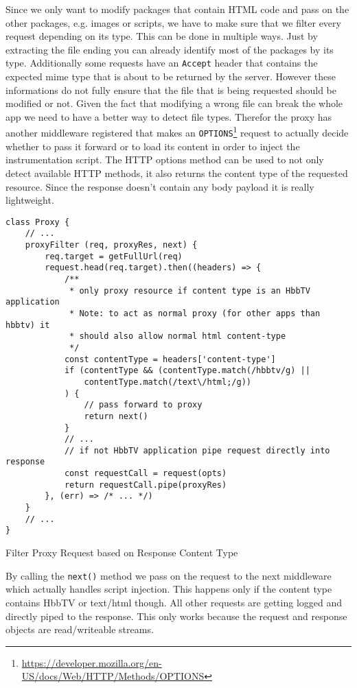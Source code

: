 Since we only want to modify packages that contain HTML code and pass on the other packages, e.g. images or scripts, we have to make sure that we filter every request depending on its type. This can be done in multiple ways. Just by extracting the file ending you can already identify most of the packages by its type. Additionally some requests have an \texttt{Accept} header that contains the expected mime type that is about to be returned by the server. However these informations do not fully ensure that the file that is being requested should be modified or not. Given the fact that modifying a wrong file can break the whole app we need to have a better way to detect file types. Therefor the proxy has another middleware registered that makes an \texttt{OPTIONS}\footnote{\url{https://developer.mozilla.org/en-US/docs/Web/HTTP/Methods/OPTIONS}} request to actually decide whether to pass it forward or to load its content in order to inject the instrumentation script. The HTTP options method can be used to not only detect available HTTP methods, it also returns the content type of the requested resource. Since the response doesn't contain any body payload it is really lightweight.

\begin{listing}[H]
\begin{verbatim}
class Proxy {
    // ...
    proxyFilter (req, proxyRes, next) {
        req.target = getFullUrl(req)
        request.head(req.target).then((headers) => {
            /**
             * only proxy resource if content type is an HbbTV application
             * Note: to act as normal proxy (for other apps than hbbtv) it
             * should also allow normal html content-type
             */
            const contentType = headers['content-type']
            if (contentType && (contentType.match(/hbbtv/g) ||
                contentType.match(/text\/html;/g))
            ) {
                // pass forward to proxy
                return next()
            }
            // ...
            // if not HbbTV application pipe request directly into response
            const requestCall = request(opts)
            return requestCall.pipe(proxyRes)
        }, (err) => /* ... */)
    }
    // ...
}
\end{verbatim}
\caption{Filter Proxy Request based on Response Content Type}
\label{lst:proxyFilter}
\end{listing}

By calling the \texttt{next()} method we pass on the request to the next middleware which actually handles script injection. This happens only if the content type contains HbbTV or text/html though. All other requests are getting logged and directly piped to the response. This only works because the request and response objects are read/writeable streams.

